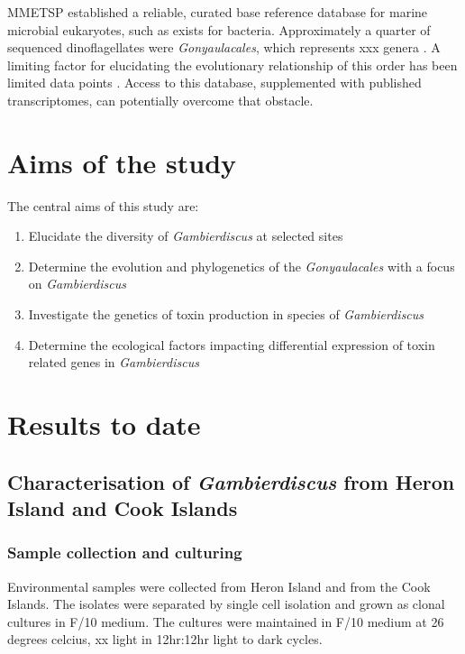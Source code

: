 \documentclass[12pt]{article}
\begin{document}
MMETSP established a reliable, curated base reference database for marine microbial eukaryotes, such as exists for bacteria. Approximately a quarter of sequenced dinoflagellates were \emph{Gonyaulacales}, which represents xxx genera \cite{keeling2014marine}. A limiting factor for elucidating the evolutionary relationship of this order has been limited data points \cite{bachvaroff2014dinoflagellate,gentekaki2014large,orr2012naked}. Access to this database, supplemented with published transcriptomes, can potentially overcome that obstacle. \\ 

\section{Aims of the study}
The central aims of this study are:
\begin{enumerate}
\item Elucidate the diversity of \emph{Gambierdiscus} at selected sites
\item Determine the evolution and phylogenetics of the \emph{Gonyaulacales} with a focus on \emph{Gambierdiscus}
\item Investigate the genetics of toxin production in species of \emph{Gambierdiscus}
\item Determine the ecological factors impacting differential expression of toxin related genes in \emph{Gambierdiscus}
\end{enumerate}

\section{Results to date}

\subsection{Characterisation of \emph{Gambierdiscus} from Heron Island and Cook Islands}

\subsubsection{Sample collection and culturing}
Environmental samples were collected from Heron Island and from the Cook Islands.
The isolates were separated by single cell isolation and grown as clonal cultures in F/10 medium. The cultures were maintained in F/10 medium at 26 degrees celcius, xx light in 12hr:12hr light to dark cycles.
\end{document}
